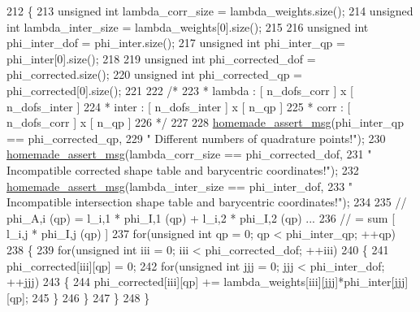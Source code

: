 \begin{DoxyCode}
212     \{
213         \textcolor{keywordtype}{unsigned} \textcolor{keywordtype}{int} lambda\_corr\_size   = lambda\_weights.size();
214         \textcolor{keywordtype}{unsigned} \textcolor{keywordtype}{int} lambda\_inter\_size  = lambda\_weights[0].size();
215 
216         \textcolor{keywordtype}{unsigned} \textcolor{keywordtype}{int} phi\_inter\_dof      = phi\_inter.size();
217         \textcolor{keywordtype}{unsigned} \textcolor{keywordtype}{int} phi\_inter\_qp       = phi\_inter[0].size();
218 
219         \textcolor{keywordtype}{unsigned} \textcolor{keywordtype}{int} phi\_corrected\_dof      = phi\_corrected.size();
220         \textcolor{keywordtype}{unsigned} \textcolor{keywordtype}{int} phi\_corrected\_qp       = phi\_corrected[0].size();
221 
222         \textcolor{comment}{/*}
223 \textcolor{comment}{        *       lambda  : [ n\_dofs\_corr ] x [ n\_dofs\_inter ]}
224 \textcolor{comment}{        *       inter   : [ n\_dofs\_inter ] x [ n\_qp ]}
225 \textcolor{comment}{        *       corr    : [ n\_dofs\_corr ] x [ n\_qp ]}
226 \textcolor{comment}{        */}
227 
228         \hyperlink{common__header_8h_a593ccc80b790b2268653fcf6597bf451}{homemade\_assert\_msg}(phi\_inter\_qp == phi\_corrected\_qp,
229                         \textcolor{stringliteral}{" Different numbers of quadrature points!"});
230         \hyperlink{common__header_8h_a593ccc80b790b2268653fcf6597bf451}{homemade\_assert\_msg}(lambda\_corr\_size == phi\_corrected\_dof,
231                         \textcolor{stringliteral}{" Incompatible corrected shape table and barycentric coordinates!"});
232         \hyperlink{common__header_8h_a593ccc80b790b2268653fcf6597bf451}{homemade\_assert\_msg}(lambda\_inter\_size == phi\_inter\_dof,
233                         \textcolor{stringliteral}{" Incompatible intersection shape table and barycentric coordinates!"});
234 
235         \textcolor{comment}{// phi\_A,i (qp) = l\_i,1 * phi\_I,1 (qp) + l\_i,2 * phi\_I,2 (qp) ...}
236         \textcolor{comment}{//              = sum [ l\_i,j * phi\_I,j (qp) ]}
237         \textcolor{keywordflow}{for}(\textcolor{keywordtype}{unsigned} \textcolor{keywordtype}{int} qp = 0; qp < phi\_inter\_qp; ++qp)
238         \{
239             \textcolor{keywordflow}{for}(\textcolor{keywordtype}{unsigned} \textcolor{keywordtype}{int} iii = 0; iii < phi\_corrected\_dof; ++iii)
240             \{
241                 phi\_corrected[iii][qp] = 0;
242                 \textcolor{keywordflow}{for}(\textcolor{keywordtype}{unsigned} \textcolor{keywordtype}{int} jjj = 0; jjj < phi\_inter\_dof; ++jjj)
243                 \{
244                     phi\_corrected[iii][qp] += lambda\_weights[iii][jjj]*phi\_inter[jjj][qp];
245                 \}
246             \}
247         \}
248     \}
\end{DoxyCode}
\hypertarget{classcarl_1_1assemble__coupling__matrices_a68f48738c5ee19dc3b23f7c7b5645f84}{}
